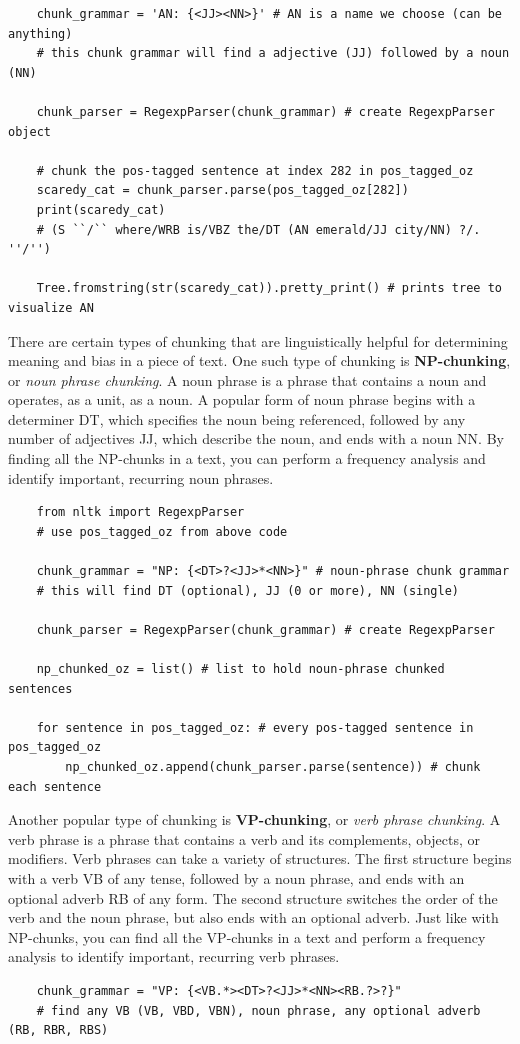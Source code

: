 \documentclass[11pt, a4paper]{article}
\begin{document}
\begin{spacing}{1.1}
\begin{lstlisting}
	chunk_grammar = 'AN: {<JJ><NN>}' # AN is a name we choose (can be anything)
	# this chunk grammar will find a adjective (JJ) followed by a noun (NN)
	
	chunk_parser = RegexpParser(chunk_grammar) # create RegexpParser object
	
	# chunk the pos-tagged sentence at index 282 in pos_tagged_oz
	scaredy_cat = chunk_parser.parse(pos_tagged_oz[282])
	print(scaredy_cat) 
	# (S ``/`` where/WRB is/VBZ the/DT (AN emerald/JJ city/NN) ?/. ''/'')
	
	Tree.fromstring(str(scaredy_cat)).pretty_print() # prints tree to visualize AN	\end{lstlisting} \vspace*{1mm}
	There are certain types of chunking that are linguistically helpful for determining meaning and bias in a piece of text. One such type of chunking is \textbf{NP-chunking}, or \textit{noun phrase chunking}. A noun phrase is a phrase that contains a noun and operates, as a unit, as a noun. A popular form of noun phrase begins with a determiner DT, which specifies the noun being referenced, followed by any number of adjectives JJ, which describe the noun, and ends with a noun NN. By finding all the NP-chunks in a text, you can perform a frequency analysis and identify important, recurring noun phrases.
	\begin{lstlisting}
	from nltk import RegexpParser
	# use pos_tagged_oz from above code	
	
	chunk_grammar = "NP: {<DT>?<JJ>*<NN>}" # noun-phrase chunk grammar
	# this will find DT (optional), JJ (0 or more), NN (single)
	
	chunk_parser = RegexpParser(chunk_grammar) # create RegexpParser
	
	np_chunked_oz = list() # list to hold noun-phrase chunked sentences
	
	for sentence in pos_tagged_oz: # every pos-tagged sentence in pos_tagged_oz
		np_chunked_oz.append(chunk_parser.parse(sentence)) # chunk each sentence \end{lstlisting} \vspace*{1mm}
	Another popular type of chunking is \textbf{VP-chunking}, or \textit{verb phrase chunking}. A verb phrase is a phrase that contains a verb and its complements, objects, or modifiers. Verb phrases can take a variety of structures. The first structure begins with a verb VB of any tense, followed by a noun phrase, and ends with an optional adverb RB of any form. The second structure switches the order of the verb and the noun phrase, but also ends with an optional adverb. Just like with NP-chunks, you can find all the VP-chunks in a text and perform a frequency analysis to identify important, recurring verb phrases. 
	\begin{lstlisting}
	chunk_grammar = "VP: {<VB.*><DT>?<JJ>*<NN><RB.?>?}"
	# find any VB (VB, VBD, VBN), noun phrase, any optional adverb (RB, RBR, RBS)
	

\end{lstlisting}
\end{spacing}
\end{document}
